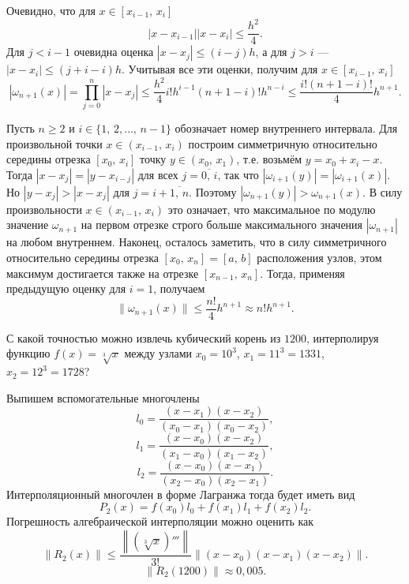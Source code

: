 \documentclass[a4paper]{article}
\begin{document}
\begin{sol}
Очевидно, что для $x \in [x_{i-1},\,x_i]$
\[
|x-x_{i-1}| |x-x_i|\le \frac{h^2}{4}
.\] 
Для $j<i-1$ очевидна оценка $|x-x_j|\le (i-j)h$, а
для $j>i$ --- $|x-x_i|\le (j+i-i)h$. Учитывая все
эти оценки, получим для $x \in [x_{i-1},\,x_i]$ 
\[
	|\omega_{n+1}(x)|= \prod_{j=0}^{n} |x-x_j|\le 
	\frac{h^2}{4}i! h^{i-1} (n+1-i)!h^{n-i}\le 
	\frac{i!(n+1-i)!}{4}h^{n+1}
.\] 

Пусть $n\ge 2$ и $i \in \{1,\,2,\ldots,\,n-1\} $ обозначает номер внутреннего интервала. Для произвольной точки
$x \in (x_{i-1},\,x_i)$ построим симметричную относительно
середины отрезка $[x_0,\,x_i]$ точку $y \in (x_0,\,x_1)$,
т.\:е. возьмём $y=x_0+x_i-x$. Тогда $|x-x_j|=|y-x_{i-j}|$ 
для всех $j = \overline{0,\,i}$, так что $|\omega_{i+1}(y)|=|\omega_{i+1}(x)|$. Но $|y-x_j|>|x-x_j|$ для
$j=i + \overline{1,\,n}$. Поэтому $|\omega_{n+1}(y)|>
\omega_{n+1}(x)$. В силу произвольности $x \in (x_{i-1},\,
 x_i)$ это означает, что максимальное по модулю
 значение  $\omega_{n+1}$ на первом отрезке строго больше
максимального значения $|\omega_{n+1}|$ на любом внутреннем. Наконец, осталось заметить, что в силу симметричного
относительно середины отрезка $[x_0,\,x_n]=[a,\,b]$
расположения узлов, этом максимум достигается также
на отрезке $[x_{n-1},\,x_n]$. Тогда, применяя предыдущую
оценку для $i=1$, получаем
\[
	\| \omega_{n+1}(x)\|\le \frac{n!}{4}h^{n+1}\approx n! h^{n+1}
.\] 
\end{sol}
\begin{hiProb}[8.7]
С какой точностью можно извлечь кубический корень из $1200$,
интерполируя функцию $f(x)= \sqrt[3]{x} $ между узлами
$x_0=10^3$, $x_1=11^3=1331$, $x_2=12^3=1728$?
\end{hiProb}
\begin{sol}
Выпишем вспомогательные многочлены
\[
	l_0=\frac{(x-x_1)(x-x_2)}{(x_0-x_1)(x_0-x_2)}
,\] 
\[
	l_1=\frac{(x-x_0)(x-x_2)}{(x_1-x_0)(x_1-x_2)}
,\]
\[
	l_2=\frac{(x-x_0)(x-x_1)}{(x_2-x_0)(x_2-x_1)}
.\]
Интерполяционный многочлен в форме Лагранжа тогда будет иметь вид
\[
	P_2(x)=f(x_0)l_0+f(x_1)l_1+f(x_2)l_2
.\] 
Погрешность алгебраической интерполяции можно оценить как
\[
	\| R_2(x)\|\le  \frac{\left\| \left( \sqrt[3]{x}  \right)''' \right\|}{3!}\| (x-x_0)(x-x_1)(x-x_2)\|
.\] 
\[
	\| R_2(1200)\|\approx0,005
.\] 
\end{sol}
\end{document}
